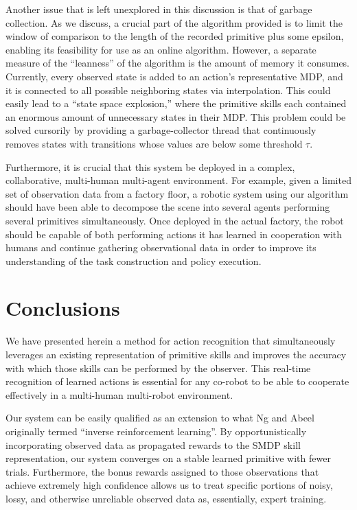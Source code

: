 \documentclass[letterpaper]{article}
\begin{document}
Another issue that is left unexplored in this discussion is that of garbage collection.  As we discuss, a crucial part of the algorithm provided is to limit the window of comparison to the length of the recorded primitive plus some epsilon, enabling its feasibility for use as an online algorithm.  However, a separate measure of the ``leanness'' of the algorithm is the amount of memory it consumes.  Currently, every observed state is added to an action's representative MDP, and it is connected to all possible neighboring states via interpolation.  This could easily lead to a ``state space explosion,'' where the primitive skills each contained an enormous amount of unnecessary states in their MDP.  This problem could be solved cursorily by providing a garbage-collector thread that continuously removes states with transitions whose values are below some threshold $\tau$.

Furthermore, it is crucial that this system be deployed in a complex, collaborative, multi-human multi-agent environment.  For example, given a limited set of observation data from a factory floor, a robotic system using our algorithm should have been able to decompose the scene into several agents performing several primitives simultaneously.  Once deployed in the actual factory, the robot should be capable of both performing actions it has learned in cooperation with humans and continue gathering observational data in order to improve its understanding of the task construction and policy execution.


\section{Conclusions}
\label{sec:conclusions}
We have presented herein a method for action recognition that simultaneously leverages an existing representation of primitive skills and improves the accuracy with which those skills can be performed by the observer.  This real-time recognition of learned actions is essential for any co-robot to be able to cooperate effectively in a multi-human multi-robot environment.  

Our system can be easily qualified as an extension to what Ng and Abeel  originally termed ``inverse reinforcement learning''.  By opportunistically incorporating observed data as propagated rewards to the SMDP skill representation, our system converges on a stable learned primitive with fewer trials.  Furthermore, the bonus rewards assigned to those observations that achieve extremely high confidence allows us to treat specific portions of noisy, lossy, and otherwise unreliable observed data as, essentially, expert training.
\end{document}
